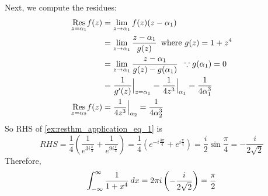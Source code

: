 \documentclass[notoc,notitlepage]{tufte-book}
\begin{document}
\begin{ex}
  Next, we compute the residues:
  \begin{align*}
    \res{f(z)}{z = \alpha_1}
      &= \lim_{z \to \alpha_1} f(z)(z - \alpha_1) \\
      &= \lim_{z \to \alpha_1} \frac{z - \alpha_1}{g(z)} \enspace \text{where } g(z) = 1 + z^4 \\
      &= \lim_{z \to \alpha_1} \frac{z - \alpha_1}{g(z) - g(\alpha_1)} \enspace \because g(\alpha_1) = 0 \\
      &= \frac{1}{g'(z)} \at{z = \alpha_1}{} = \frac{1}{4z^3} \at{\alpha_1}{} = \frac{1}{4\alpha_1^3} \\
    \res{f(z)}{z = \alpha_2}
      &= \frac{1}{4z^3} \at{\alpha_2}{} = \frac{1}{4 \alpha_2^3}
  \end{align*}
  So RHS of \cref{ex:resthm_application_eq_1} is
  \begin{equation*}
    RHS = \frac{1}{4} \left( \frac{1}{e^{3i \frac{\pi}{4} }} + \frac{1}{e^{9i \frac{\pi}{4} }} \right) = \frac{1}{4} \left( e^{- i \frac{3\pi}{4} } + e^{i \frac{\pi}{4} } \right) = \frac{i}{2} \sin \frac{\pi}{4} = -\frac{i}{2 \sqrt{2}} 
  \end{equation*}
  Therefore,
  \begin{equation*}
    \int_{-\infty}^{\infty} \frac{1}{1 + x^4} \dif{x} = 2 \pi i \left(-\frac{i}{2 \sqrt{2}} \right) = \frac{\pi}{2} 
  \end{equation*}
\end{ex}
\end{document}
